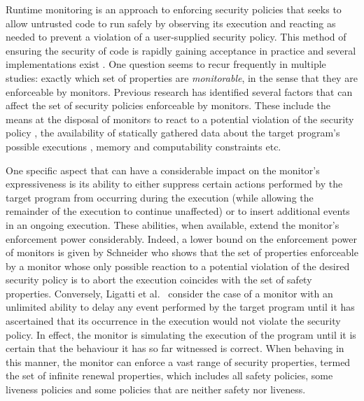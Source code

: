 \documentclass[12pt]{article}
\begin{document}
Runtime monitoring is an approach to enforcing security policies that seeks to allow untrusted code to run safely by observing its execution and reacting as needed to prevent a violation of a user-supplied security policy.  This method of ensuring the security of code is rapidly gaining acceptance in practice and several implementations exist \cite{COSREVIEW12}.  One question seems to recur frequently in multiple studies: exactly which set of properties are \textit{monitorable}, in the sense that they are enforceable by monitors. Previous research has identified several factors that can affect the set of security policies enforceable by monitors. These include the means at the disposal of monitors to react to a potential violation of the security policy \cite{MoreEnforce}, the availability of statically gathered data about the target program's possible executions \cite{ChabotJournal,MoreEnforce}, memory and computability constraints \cite{fong,Computability2} etc.

One specific aspect that can have a considerable impact on the monitor's expressiveness is its ability to either suppress certain actions performed by the target program from occurring during the execution (while allowing the remainder of the execution to continue unaffected) or to insert additional events in an ongoing execution. These abilities, when available, extend the monitor's enforcement power considerably. Indeed, a lower bound on the enforcement power of monitors is given by Schneider \cite{enforceable} who shows that the set of properties enforceable by a monitor whose only possible reaction to a potential violation of the desired security policy is to abort the execution coincides with the set of safety properties. Conversely, Ligatti et al.\ \cite{nonsafetyJournal} consider the case of a monitor with an unlimited ability to delay  any event performed by the target program until it has ascertained that its occurrence in the execution would not violate the security policy.  In effect, the monitor is simulating the execution of the program until it is certain that the behaviour it has so far witnessed is correct.  When behaving in this manner, the monitor can enforce a vast range of security properties, termed the set of infinite renewal properties, which   includes all safety policies, some liveness policies and some policies that are neither safety nor liveness.
\end{document}
